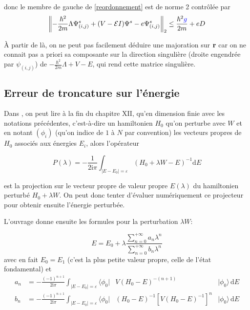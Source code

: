 \documentclass[svgnames,dvipsnames,a4paper,10pt,french]{report}
\begin{document}
\begin{appendices}
donc le membre de gauche de \ref{reordonnement} est de norme 2 contrôlée par
\begin{equation}
    \left\| -\frac{\hbar^2}{2m}\Lambda \Psi^s_{(i,j)}  + (V-\mathcal{E}I)\Psi^s - e \Psi^s_{(i,j)} \right\|_2 \le \frac{\hbar^2\textcolor{blue}{g}}{2m} + eD
\end{equation}

À partir de là, on ne peut pas facilement déduire une majoration sur $\mathbf{r}$ car on ne connait pas a priori sa composante sur la direction singulière (droite engendrée par  $\psi_{(i,j)}$) de $-\frac{\hbar^2}{2m}\Lambda +V - E$, qui rend cette matrice singulière.



\subsection{Erreur de troncature sur l'énergie}


Dans \cite{reed_methods_1980}, on peut lire à la fin du chapitre XII, qu'en dimension finie avec les notations précédentes, c'est-à-dire un hamiltonien $H_0$ qu'on perturbe avec $W$ et en notant $(\phi_i)$ (qu'on indice de $1$ à $N$ par convention) les vecteurs propres de $H_0$ associés aux énergies $E_i$, alors l'opérateur

\begin{equation}
    P(\lambda) = -\frac{1}{2 \mathrm{i} \pi} \int_{|E-E_0| = \varepsilon} (H_0 + \lambda W - E )^{-1} \mathrm{d}E
\end{equation}


est la projection sur le vecteur propre de valeur propre $E(\lambda)$ du hamiltonien perturbé $H_0 + \lambda W$. On peut donc tenter d'évaluer numériquement ce projecteur pour obtenir ensuite l'énergie perturbée.

L'ouvrage donne ensuite les formules pour la perturbation $\lambda W$:

\begin{equation}
    E = E_0 + \lambda \frac{\sum_{n=0}^{+\infty} a_n \lambda^n}{\sum_{n=0}^{+\infty} b_n \lambda^n}
\end{equation}
avec en fait $E_0=E_1$ (c'est la plus petite valeur propre, celle de l'état fondamental) et 
\begin{align}
    a_n &= -\frac{(-1)^{n+1}}{2 \mathrm{i}\pi} \int_{|E-E_0| = \varepsilon} \langle \phi_0 | &V(H_0-E)^{-(n+1)} &| \phi_0 \rangle  \, \mathrm{d}E \\
    b_n &= -\frac{(-1)^{n+1}}{2 \mathrm{i}\pi} \int_{|E-E_0| = \varepsilon} \langle \phi_0 | &(H_0-E)^{-1} [V(H_0-E)^{-1}]^n &| \phi_0 \rangle \, \mathrm{d}E
\end{align}


\end{appendices}
\end{document}
